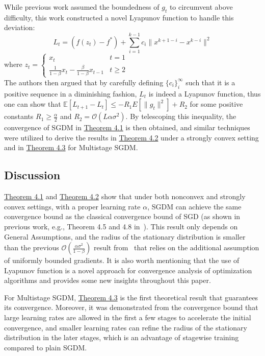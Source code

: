 \documentclass{article}
\begin{document}
While previous work assumed the boundedness of $g_t$ to circumvent above difficulty, this work constructed a novel Lyapunov function to handle this deviation:
\[
L_t = (f(z_t) - f^*) + \sum_{i = 1}^{k - 1}c_i\|x^{k + 1 - i} - x^{k - i}\|^2
\]
where $z_t = \begin{cases}
	x_t & t = 1 \\
	\frac{1}{1 - \beta}x_t - \frac{\beta}{1 - \beta}x_{t - 1} & t \geq 2
\end{cases}$\\

The authors then argued that by carefully defining $\{c_i\}_i^\infty$ such that it is a positive sequence in a diminishing fashion, $L_t$ is indeed a Lyapunov function, thus one can show that $\mathbb{E}[L_{t + 1} - L_t] \leq -R_1E[\|g_t\|^2] + R_2$ for some positive constants $R_1 \geq \frac{\alpha}{2}$ and $R_2 = \mathcal{O}(L\alpha\sigma^2)$. By telescoping this inequality, the convergence of SGDM in \hyperref[theom41]{Theorem 4.1} is then obtained, and similar techniques were utilized to derive the results in \hyperref[theom42]{Theorem 4.2} under a strongly convex setting and in \hyperref[theom43]{Theorem 4.3} for Multistage SGDM.
\subsection{Discussion}
\hyperref[theom41]{Theorem 4.1} and \hyperref[theom42]{Theorem 4.2} show that under both nonconvex and strongly convex settings, with a proper learning rate $\alpha$, SGDM can achieve the same convergence bound as the classical convergence bound of SGD (as shown in previous work, e.g., Theorem 4.5 and 4.8 in~\cite{https://doi.org/10.48550/arxiv.1606.04838}). This result only depends on General Assumptions, and the radius of the stationary distribution is smaller than the previous $\mathcal{O}(\frac{\alpha\sigma^2}{1 - \beta})$ result from~\cite{https://doi.org/10.48550/arxiv.1905.03817} that relies on the additional assumption of uniformly bounded gradients. It is also worth mentioning that the use of Lyapunov function is a novel approach for convergence analysis of optimization algorithms and provides some new insights throughout this paper. 

For Multistage SGDM, \hyperref[theom42]{Theorem 4.3} is the first theoretical result that guarantees its convergence. Moreover, it was demonstrated from the convergence bound that large learning rates are allowed in the first a few stages to accelerate the initial convergence, and smaller learning rates can refine the radius of the stationary distribution in the later stages, which is an advantage of stagewise training compared to plain SGDM.
\end{document}
